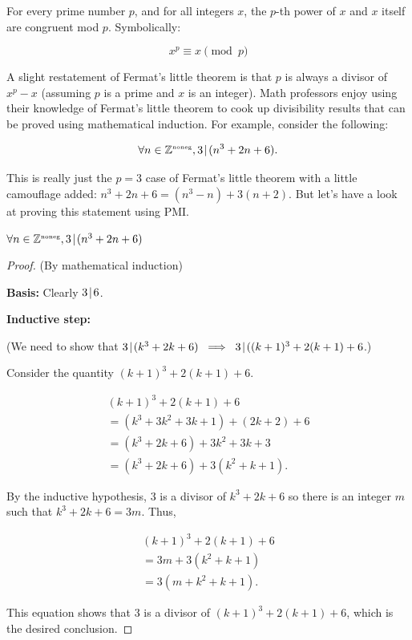 \begin{thm} 
For every prime number $p$, and for all integers $x$, the $p$-th 
power of $x$ and $x$ itself are congruent mod $p$.  Symbolically:

\[ x^p \equiv x \pmod{p} \]
\end{thm}

A slight restatement of Fermat's little theorem is that $p$ is
always a divisor of $x^p-x$ (assuming $p$ is a prime and $x$ is an integer).
Math professors enjoy using their knowledge of Fermat's little theorem
to cook up divisibility results that can be proved using mathematical
induction.   For example, consider the following:

\[ \forall n \in {\mathbb Z}^{\mbox{\tiny noneg}},  3 \!\mid\! (n^3 + 2n + 6). \]  

This is really just the $p=3$ case of Fermat's little theorem 
with a little camouflage added: $n^3 + 2n + 6 = (n^3-n)+3(n+2)$.
But let's have a look at proving this statement using PMI. 

\begin{thm} 
$\forall n \in {\mathbb Z}^{\mbox{\tiny noneg}},  3 \!\mid\! (n^3 + 2n + 6)$
\end{thm}

\begin{proof}
(By mathematical induction)

{\bf Basis:} Clearly $3 \!\mid\! 6$.

{\bf Inductive step:} 

\noindent (We need to show that $3 \!\mid\! (k^3 + 2k + 6) \; \implies \; 3 \!\mid\! ((k+1)^3 + 2(k+1) + 6$.)

Consider the quantity $(k+1)^3 + 2(k+1) + 6$.

\begin{gather*}
   (k+1)^3 + 2(k+1) + 6 \\
 = (k^3 + 3k^2 + 3k + 1) + (2k + 2) + 6\\
 = (k^3 + 2k + 6) + 3k^2 + 3k + 3\\
 = (k^3 + 2k + 6) + 3(k^2 + k + 1).
\end{gather*}

By the inductive hypothesis, 3 is a divisor of $k^3 + 2k + 6$ so there
is an integer $m$ such that $k^3 + 2k + 6 = 3m$.
Thus,

\begin{gather*}
(k+1)^3 + 2(k+1) + 6 \\
= 3m + 3(k^2 + k + 1) \\
= 3(m + k^2 + k + 1).
\end{gather*}

This equation shows that 3 is a divisor of $(k+1)^3 + 2(k+1) + 6$, which
is the desired conclusion.
\end{proof}

